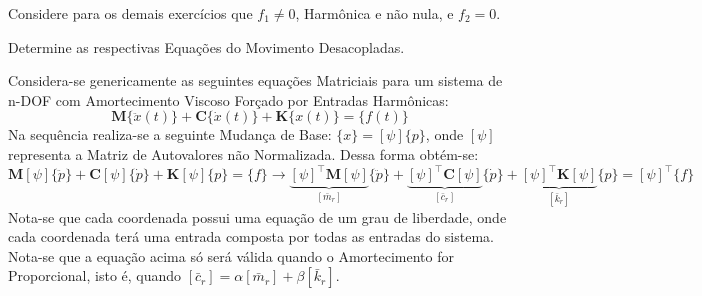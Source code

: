 \documentclass{article}
\begin{document}
\newpage\begin{exercise}\label{ex3}
    Considere para os demais exercícios que $f_1 \neq 0$, Harmônica e não nula, e $f_2 = 0$.
\end{exercise}
\begin{exercise}\label{ex4}
    Determine as respectivas Equações do Movimento Desacopladas.
\end{exercise}
\begin{resolution}
    Considera-se genericamente as seguintes equações Matriciais para um sistema de n-DOF com Amortecimento Viscoso Forçado por Entradas Harmônicas:
    \begin{equation}
        \mathbf{M}\{\ddot{x}(t)\} + \mathbf{C}\{\dot{x}(t)\} + \mathbf{K}\{x(t)\} = \{f(t)\}\label{eq:nDOFAF}
    \end{equation}
    Na sequência realiza-se a seguinte Mudança de Base: $\{x\} = [\psi] \{p\}$, onde $[\psi]$ representa a Matriz de Autovalores não Normalizada. Dessa forma obtém-se:
    \begin{equation*}
        \mathbf{M}[\psi]\{\ddot{p}\} + \mathbf{C}[\psi]\{\dot{p}\} + \mathbf{K}[\psi]\{p\} = \{f\} \to
        \underbrace{[\psi]^\intercal\mathbf{M}[\psi]}_{[\bar{m}_{r}]}\{\ddot{p}\} + 
        \underbrace{[\psi]^\intercal\mathbf{C}[\psi]}_{[\bar{c}_{r}]}\{\dot{p}\} + 
        \underbrace{[\psi]^\intercal\mathbf{K}[\psi]}_{[\bar{k}_{r}]}\{p\} = 
        [\psi]^\intercal\{f\}
    \end{equation*}
    Nota-se que cada coordenada possui uma equação de um grau de liberdade, onde cada coordenada terá uma entrada composta por todas as entradas do sistema.\\

    Nota-se que a equação acima só será válida quando o Amortecimento for Proporcional, isto é, quando $[\bar{c}_r] = \alpha [\bar{m}_r] + \beta [\bar{k}_r]$.\\


\end{resolution}
\end{document}
